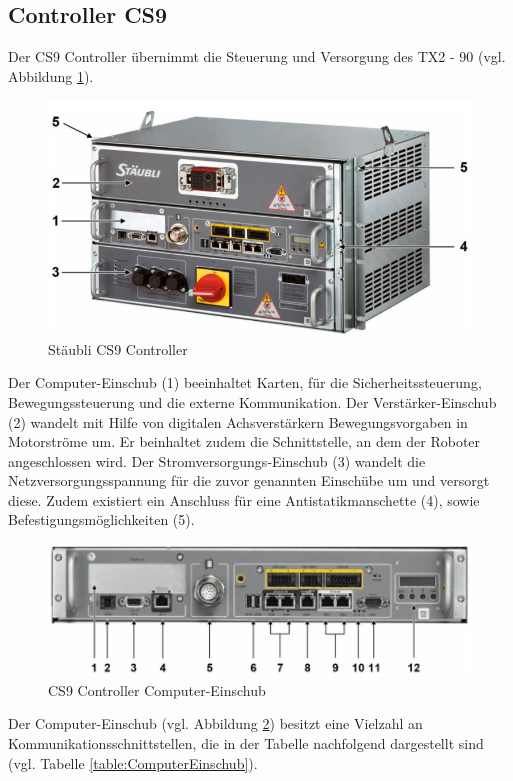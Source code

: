 \documentclass[ a4paper,
                oneside,
                toc=bibliography,
                toc=listof
                ]{scrbook}
\begin{document}
   	\subsection{Controller CS9}
   	Der CS9 Controller übernimmt die Steuerung und Versorgung des TX2 - 90 (vgl. Abbildung \ref{fig:CS9}).
   	\begin{figure}[!ht]
   		\centering
   		\includegraphics[width=0.70\linewidth]{./images/CS9.png}
   		\caption{Stäubli CS9 Controller \cite{CS9}} 
   		\label{fig:CS9}
   	\end{figure}
   	Der Computer-Einschub (1) beeinhaltet Karten, für die Sicherheitssteuerung, Bewegungssteuerung und die externe Kommunikation. Der Verstärker-Einschub (2) wandelt mit Hilfe von digitalen Achsverstärkern Bewegungsvorgaben in Motorströme um. Er beinhaltet zudem die Schnittstelle, an dem der Roboter angeschlossen wird. Der Stromversorgungs-Einschub (3) wandelt die Netzversorgungsspannung für die zuvor genannten Einschübe um und versorgt diese. Zudem existiert ein Anschluss für eine Antistatikmanschette (4), sowie Befestigungsmöglichkeiten (5).
   	\begin{figure}[!ht]
   		\centering
   		\includegraphics[width=0.70\linewidth]{./images/ComputerEinschub.png}
   		\caption{CS9 Controller Computer-Einschub \cite{CS9}} 
   		\label{fig:ComputerEinschub}
   	\end{figure}
   	Der Computer-Einschub (vgl. Abbildung \ref{fig:ComputerEinschub}) besitzt eine Vielzahl an Kommunikationsschnittstellen, die in der Tabelle nachfolgend dargestellt sind (vgl. Tabelle \ref{table:ComputerEinschub}).
\end{document}
